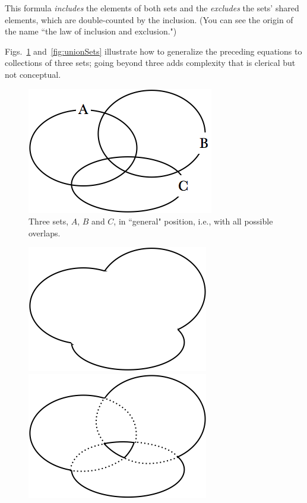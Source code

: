 \begin{itemize}
\begin{itemize}
This formula {\em includes} the elements of both sets and the {\em excludes} the sets'
shared elements, which are double-counted by the inclusion.  (You can see the origin of the
name ``the law of inclusion and exclusion.")
 \end{itemize}
Figs.~\ref{fig:unionSetsInit} and~\ref{fig:unionSets} illustrate how to generalize the preceding equations to
collections of three sets; going beyond three adds complexity that is clerical but not conceptual.
\begin{figure}[htb]
\begin{center}
        \includegraphics[scale=0.35]{FiguresMaths/3sets}
        \caption{Three sets, $A$, $B$ and $C$, in ``general" position, i.e., with all possible overlaps.}
        \label{fig:unionSetsInit}
\end{center}
\end{figure}
\begin{figure}[htb]
\begin{center}
        \includegraphics[scale=0.35]{FiguresMaths/RuleAdditive}
        \hspace{1cm}
        \includegraphics[scale=0.35]{FiguresMaths/RuleAdditive2}

\end{center}
\end{figure}
\end{itemize}
